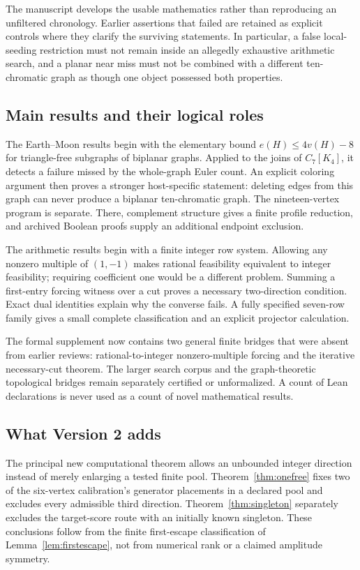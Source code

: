 \documentclass[11pt,letterpaper]{article}
\theoremstyle{definition}
\theoremstyle{remark}\newtheorem{remark}[theorem]{Remark}
\begin{document}
The manuscript develops the usable mathematics rather than reproducing an unfiltered chronology. Earlier assertions that failed are retained as explicit controls where they clarify the surviving statements. In particular, a false local-seeding restriction must not remain inside an allegedly exhaustive arithmetic search, and a planar near miss must not be combined with a different ten-chromatic graph as though one object possessed both properties.

\subsection{Main results and their logical roles}
The Earth--Moon results begin with the elementary bound $e(H)\leq4v(H)-8$ for triangle-free subgraphs of biplanar graphs. Applied to the joins of $C_7[K_4]$, it detects a failure missed by the whole-graph Euler count. An explicit coloring argument then proves a stronger host-specific statement: deleting edges from this graph can never produce a biplanar ten-chromatic graph. The nineteen-vertex program is separate. There, complement structure gives a finite profile reduction, and archived Boolean proofs supply an additional endpoint exclusion.

The arithmetic results begin with a finite integer row system. Allowing any nonzero multiple of $(1,-1)$ makes rational feasibility equivalent to integer feasibility; requiring coefficient one would be a different problem. Summing a first-entry forcing witness over a cut proves a necessary two-direction condition. Exact dual identities explain why the converse fails. A fully specified seven-row family gives a small complete classification and an explicit projector calculation.

The formal supplement now contains two general finite bridges that were absent from earlier reviews: rational-to-integer nonzero-multiple forcing and the iterative necessary-cut theorem. The larger search corpus and the graph-theoretic topological bridges remain separately certified or unformalized. A count of Lean declarations is never used as a count of novel mathematical results.

\subsection{What Version 2 adds}
The principal new computational theorem allows an unbounded integer direction instead of merely enlarging a tested finite pool. Theorem~\ref{thm:onefree} fixes two of the six-vertex calibration's generator placements in a declared pool and excludes every admissible third direction. Theorem~\ref{thm:singleton} separately excludes the target-score route with an initially known singleton. These conclusions follow from the finite first-escape classification of Lemma~\ref{lem:firstescape}, not from numerical rank or a claimed amplitude symmetry.
\end{document}
